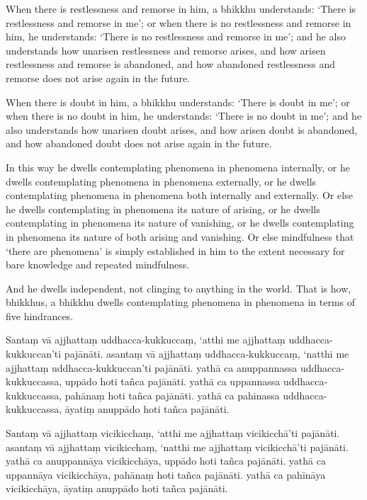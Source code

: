 \englishPage

When there is restlessness and remorse in him, a bhikkhu understands:
`There is restlessness and remorse in me';
or when there is no restlessness and remorse in him, he understands:
`There is no restlessness and remorse in me';
and he also understands how unarisen restlessness and remorse arises,
and how arisen restlessness and remorse is abandoned,
and how abandoned restlessness and remorse does not arise again in the future.

When there is doubt in him, a bhikkhu understands:
`There is doubt in me';
or when there is no doubt in him, he understands:
`There is no doubt in me';
and he also understands how unarisen doubt arises,
and how arisen doubt is abandoned,
and how abandoned doubt does not arise again in the future.

In this way he dwells contemplating phenomena in phenomena internally, or he
dwells contemplating phenomena in phenomena externally, or he dwells
contemplating phenomena in phenomena both internally and externally. Or else he
dwells contemplating in phenomena its nature of arising, or he dwells
contemplating in phenomena its nature of vanishing, or he dwells contemplating
in phenomena its nature of both arising and vanishing. Or else mindfulness that
‘there are phenomena’ is simply established in him to the extent necessary for
bare knowledge and repeated mindfulness.

And he dwells independent, not clinging to anything in the world. That is how,
bhikkhus, a bhikkhu dwells contemplating phenomena in phenomena in terms of five
hindrances.


\paliPage

Santaṃ vā ajjhattaṃ uddhacca-kukkuccaṃ, `atthi me ajjhattaṃ uddhacca-kukkuccan'ti pajānāti.
asantaṃ vā ajjhattaṃ uddhacca-kukkuccaṃ, `natthi me ajjhattaṃ uddhacca-kukkuccan'ti pajānāti.
yathā ca anuppannassa uddhacca-kukkuccassa, uppādo hoti tañca pajānāti.
yathā ca uppannassa uddhacca-kukkuccassa, pahānaṃ hoti tañca pajānāti.
yathā ca pahīnassa uddhacca-kukkuccassa, āyatiṃ anuppādo hoti tañca pajānāti.

Santaṃ vā ajjhattaṃ vicikicchaṃ, `atthi me ajjhattaṃ vicikicchā'ti pajānāti.
asantaṃ vā ajjhattaṃ vicikicchaṃ, `natthi me ajjhattaṃ vicikicchā'ti pajānāti.
yathā ca anuppannāya vicikicchāya, uppādo hoti tañca pajānāti.
yathā ca uppannāya vicikicchāya, pahānaṃ hoti tañca pajānāti.
yathā ca pahīnāya vicikicchāya, āyatiṃ anuppādo hoti tañca pajānāti.

